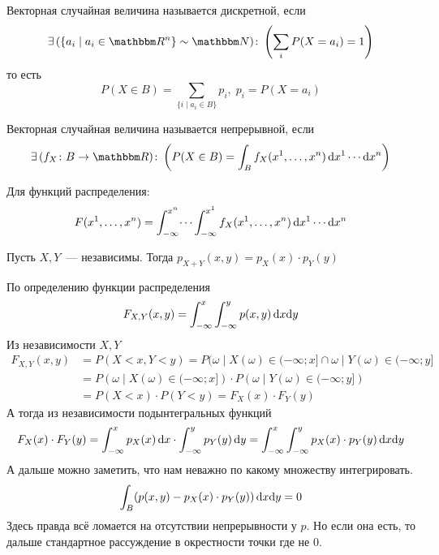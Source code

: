 \documentclass[12pt,ebook]{../../../notes}
\begin{document}
\begin{defn}\label{defn:stat::randvec::disc}
  Векторная случайная величина называется дискретной, если
  \[
    \exists\,(\{a_i\mid a_i \in \R^n \} \sim \N)\colon \left( \sum_{i} P(X = a_i) = 1 \right)
  \]
  то есть 
  \[
    P(X\in B) = \sum_{\{i\mid a_i\in B\}} p_i, \; p_i = P(X = a_i)
  \]
\end{defn}
\begin{defn}\label{defn:stat::randvec::cony}
  Векторная случайная величина называется непрерывной, если
  \[
    \exists\,(f_X\colon B\to \R )\colon \left( P(X\in B) = \int_{B} f_X(x^1, \dotsc, x^n)\, \del
    x^1 \dotsm \del x^n \right)
  \]
\end{defn}
\begin{rem}\label{rem:stat::randvec::distfun }
  Для функций распределения:
  \[
    F(x^1, \dotsc, x^n) = \int_{-\infty}^{x^n}\dotsi\int_{-\infty}^{x^1} f_X(x^1, \dotsc, x^n)\,
    \mathrm{d} x^1 \dotsm \mathrm{d} x^n 
  \]
\end{rem}

\begin{prop}\label{prop:stat::randvec::ind}
  Пусть $X, Y$~--- независимы. Тогда $p_{X+Y}(x,y)=p_X(x) \cdot p_Y(y)$
\end{prop}
\begin{itlproof}
  По определению функции распределения
  \[
    F_{X,Y}(x,y) = \int_{-\infty}^x\int_{-\infty}^y p(x,y) \, \mathrm{d} x\mathrm{d} y
  \]
  Из независимости $X,Y$
  \[
    \begin{split}
      F_{X,Y} (x,y) &= P(X<x,Y<y) = P({\omega\mid X(\omega)\in (-\infty;x]}\cap {\omega\mid
        Y(\omega)\in (-\infty;y]} \\
        &= P({\omega\mid X(\omega)\in (-\infty;x]})\cdot
        P({\omega\mid Y(\omega)\in (-\infty;y]}) \\
        &= P(X<x) \cdot P(Y<y) = F_X(x)\cdot F_Y(y)
      \end{split}
  \]
  А тогда из независимости подынтегральных функций
  \[
    F_X(x)\cdot F_Y(y) = \int_{-\infty}^x p_X(x) \, \mathrm{d} x \cdot \int_{-\infty}^y p_Y(y) \, \mathrm{d} y 
    = \int_{-\infty}^x\int_{-\infty}^y p_X(x)\cdot p_Y(y) \, \mathrm{d} x\mathrm{d} y
  \]
  А дальше можно заметить, что нам неважно по какому множеству интегрировать.
  \[
    \int_B (p(x,y) - p_X(x)\cdot p_Y(y)) \, \mathrm{d} x\mathrm{d} y = 0
  \]
  Здесь правда всё ломается на отсутствии непрерывности у $p$. Но если она есть, то дальше
  стандартное рассуждение в окрестности точки где не 0.
\end{itlproof}
\end{document}
